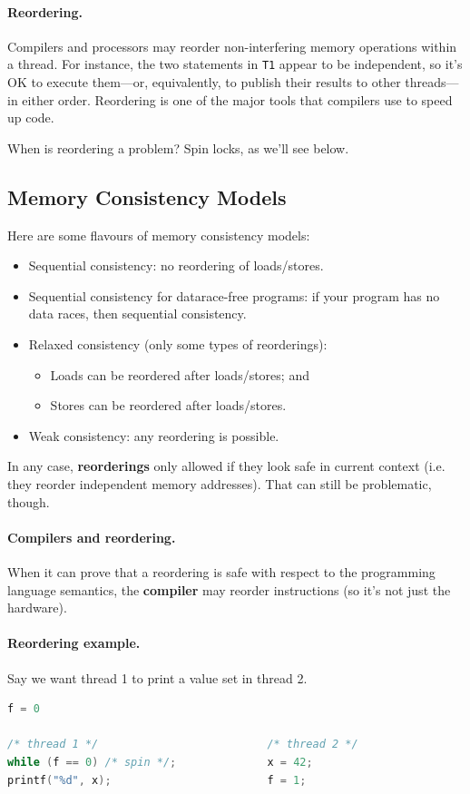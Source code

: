 \documentclass[a4paper]{report}
\begin{document}
\paragraph{Reordering.} Compilers and processors may reorder 
non-interfering memory operations within a thread. For instance, the
two statements in {\tt T1} appear to be independent, so it's OK to
execute them---or, equivalently, to publish their results to other
threads---in either order. Reordering is one of the major tools that
compilers use to speed up code.

When is reordering a problem? Spin locks, as we'll see below.

\subsection*{Memory Consistency Models}

Here are some flavours of memory consistency models:

\begin{itemize}
\item Sequential consistency: no reordering of loads/stores.
\item Sequential consistency for datarace-free programs: if your program
  has no data races, then sequential consistency.
\item Relaxed consistency (only some types of reorderings):
\begin{itemize}
        \item Loads can be reordered after loads/stores; and
        \item Stores can be reordered after loads/stores.
\end{itemize}
\item     Weak consistency: any reordering is possible.
\end{itemize}

In any case, {\bf reorderings} only allowed if they look safe in
current context (i.e. they reorder independent memory addresses).
That can still be problematic, though.

\paragraph{Compilers and reordering.}
When it can prove that a reordering is safe with respect to the
programming language semantics, the {\bf compiler} may reorder instructions (so it's not just the hardware).

\paragraph{Reordering example.} Say we want thread 1 to print a value set in thread 2.
  \begin{lstlisting}[language=C]
                            f = 0

/* thread 1 */                          /* thread 2 */
while (f == 0) /* spin */;              x = 42;
printf("%d", x);                        f = 1;
  \end{lstlisting}
\end{document}
